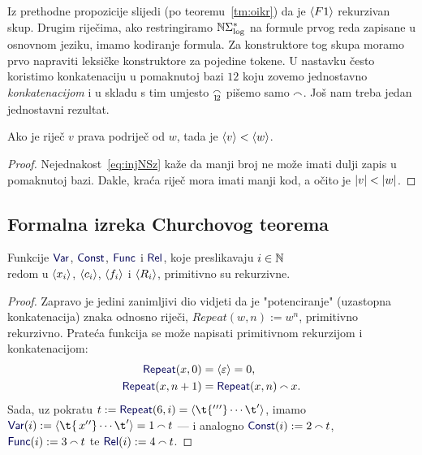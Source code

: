 Iz prethodne propozicije slijedi (po teoremu~\ref{tm:oikr}) da je $\langle F1\rangle$ rekurzivan skup. Drugim riječima, ako restringiramo ${\mathbb N}\Sigma_{\log}^*$ na formule prvog reda zapisane u osnovnom jeziku, imamo kodiranje formula. Za konstruktore tog skupa moramo prvo napraviti leksičke konstruktore za pojedine tokene. U nastavku često koristimo konkatenaciju u pomaknutoj bazi $12$ koju zovemo jednostavno \emph{konkatenacijom} i u skladu s tim umjesto $\conc{1\!2}$ pišemo samo $\conc{}$. Još nam treba jedan jednostavni rezultat.

\begin{korolar}[{name=[(prava) podriječ ima (strogo) manji kod]}]\label{kor:krvw}
Ako je riječ $v$ prava podriječ od $w$, tada je $\langle v\rangle<\langle w\rangle$.
\end{korolar}
\begin{proof}
    Nejednakost~\eqref{eq:injNSz} kaže da manji broj ne može imati dulji zapis u pomaknutoj bazi. Dakle, kraća riječ mora imati manji kod, a očito je $\lvert v\rvert<\lvert w\rvert$.
\end{proof}

\subsection{Formalna izreka Churchovog teorema}

\begin{lema}[{name=[primitivna rekurzivnost leksičke strukture formula prvog reda]}]\label{lm:lexF1}
Funkcije $\f{Var}$, $\f{Const}$, $\f{Func}$ i $\f{Rel}$, koje preslikavaju $i\in{\mathbb N}$\\ redom u $\langle x_i\rangle$, $\langle c_i\rangle$, $\langle f_i\rangle$ i $\langle R_i\rangle$, primitivno su rekurzivne.
\end{lema}
\begin{proof}
Zapravo je jedini zanimljivi dio vidjeti da je "potenciranje" (uzastopna konkatenacija) znaka odnosno riječi, $Repeat(w,n):=w^n$, primitivno rekurzivno. Prateća funkcija se može napisati primitivnom rekurzijom i konkatenacijom:
\begin{align}
    \f{Repeat}(x,0)&=\kr{\varepsilon}=0\text,\\
    \f{Repeat}(x,n+1)&=\f{Repeat}(x,n)\conc{}x\text.
\end{align}
    Sada, uz pokratu $t:=\f{Repeat}(6,i)=\kr{\t{'{}'{}'}\dotsm\t'}$, imamo $\f{Var}(i):=\kr{\t{\,x{}'{}'}\dotsm\t'}=1\conc{}t$ --- i analogno $\f{Const}(i):=2\conc{}t$, $\f{Func}(i):=3\conc{}t$ te $\f{Rel}(i):=4\conc{}t$.
\end{proof}

